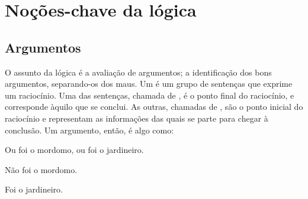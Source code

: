\part{Noções-chave da lógica}
\label{ch.intro}


\chapter{Argumentos}
\label{s:Arguments}




O assunto da lógica é a avaliação de argumentos; a identificação dos bons argumentos, separando-os dos maus.
Um  é um grupo de sentenças que exprime um raciocínio.
Uma das sentenças, chamada de , é o ponto final do raciocínio, e corresponde àquilo que se conclui.
As outras, chamadas de , são o ponto inicial do raciocínio e representam as informações das quais se parte para chegar à conclusão. 
Um argumento, então, é algo como:

	\begin{earg}\label{argButlerGardner}
		\item[] Ou foi o mordomo, ou foi o jardineiro.
		\item[] Não foi o mordomo.
		\item[\therefore] Foi o jardineiro.
	\end{earg}
	

